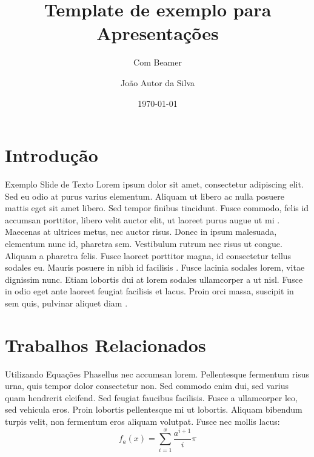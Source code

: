 \documentclass[17pt, c]{beamer}
\title{Template de exemplo para Apresentações}
\subtitle{Com Beamer}
\date{\today}
\institute[DCC]{DCC -- Departamento de Ciência da Computação}
\author[Author et al]{João Autor da Silva}
\begin{document}
\inserttitlepage


\section{Introdução}
\insertsectionpage

\begin{frame}{Exemplo Slide de Texto}
Lorem ipsum dolor sit amet, consectetur adipiscing elit. Sed eu odio at purus varius elementum. Aliquam ut libero ac nulla posuere mattis eget sit amet libero. Sed tempor finibus tincidunt. Fusce commodo, felis id accumsan porttitor, libero velit auctor elit, ut laoreet purus augue ut mi \cite{Martins2000,NBR6023:2000}.
Maecenas at ultrices metus, nec auctor risus. Donec in ipsum malesuada, elementum nunc id, pharetra sem. Vestibulum rutrum nec risus ut congue. Aliquam a pharetra felis. Fusce laoreet porttitor magna, id consectetur tellus sodales eu. Mauris posuere in nibh id facilisis \cite{Moura1998}.
Fusce lacinia sodales lorem, vitae dignissim nunc. Etiam lobortis dui at lorem sodales ullamcorper a ut nisl. Fusce in odio eget ante laoreet feugiat facilisis et lacus. Proin orci massa, suscipit in sem quis, pulvinar aliquet diam \cite{Silva2005,Lamport1994}.
\end{frame}


\section{Trabalhos Relacionados}
\insertsectionpage
\begin{frame}{Utilizando Equações}
	Phasellus nec accumsan lorem. Pellentesque fermentum risus urna, quis tempor dolor consectetur non. Sed commodo enim dui, sed varius quam hendrerit eleifend. Sed feugiat faucibus facilisis. Fusce a ullamcorper leo, sed vehicula eros. Proin lobortis pellentesque mi ut lobortis. Aliquam bibendum turpis velit, non fermentum eros aliquam volutpat. Fusce nec mollis lacus:
	\begin{equation}
		f_a(x) = \sum_{i = 1}^{x}\frac{a^{i + 1}}{i} \pi
	\end{equation}
\end{frame}
\end{document}
